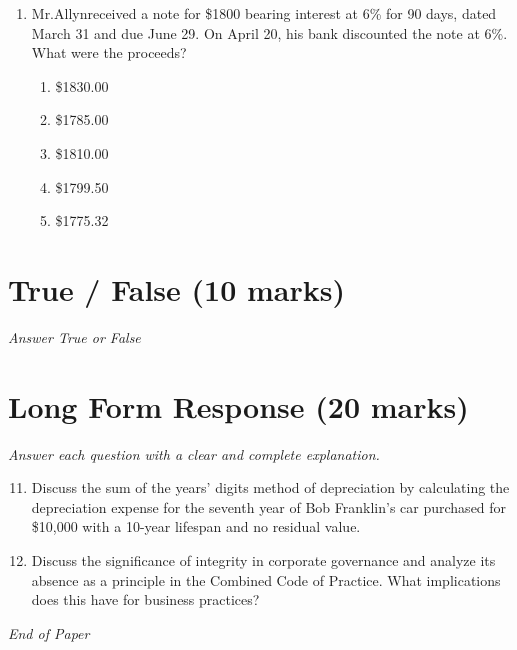 \documentclass[12pt]{article}
\begin{document}
\begin{enumerate}[label=\arabic*.]
\begin{enumerate}[label=(\alph*)]
    \item \$3035
    \item \$2,985.75
    \item \$3,000
    \item \$3024.34
    \item \$210
\end{enumerate}
\item Mr.Allynreceived a note for \$1800 bearing interest at 6\% for 90 days, dated March 31 and due June 29. On April 20, his bank discounted the note at 6\%. What were the proceeds?
\begin{enumerate}[label=(\alph*)]
    \item \$1830.00
    \item \$1785.00
    \item \$1810.00
    \item \$1799.50
    \item \$1775.32
\end{enumerate}
\end{enumerate}

\section*{True / False (10 marks)}
\textit{Answer True or False}

\section*{Long Form Response (20 marks)}
\textit{Answer each question with a clear and complete explanation.}
\begin{enumerate}[label=\arabic*.]
\setcounter{enumi}{10}
\item Discuss the sum of the years' digits method of depreciation by calculating the depreciation expense for the seventh year of Bob Franklin's car purchased for \$10,000 with a 10-year lifespan and no residual value.
\item Discuss the significance of integrity in corporate governance and analyze its absence as a principle in the Combined Code of Practice. What implications does this have for business practices?
\end{enumerate}

\vfill
\noindent\textit{End of Paper}
\end{document}

